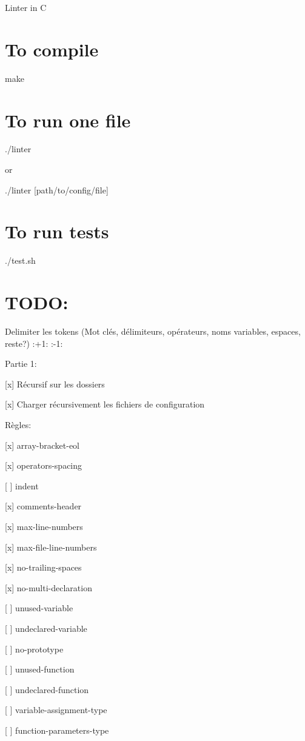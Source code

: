 Linter in C \section*{To compile}

make \section*{To run one file}

./linter

or

./linter \mbox{[}path/to/config/file\mbox{]}

\section*{To run tests}

./test.sh

\section*{T\+O\+DO\+:}


\begin{DoxyItemize}
\item Delimiter les tokens (Mot clés, délimiteurs, opérateurs, noms variables, espaces, reste?) \+:+1\+: \+:-\/1\+:
\item Partie 1\+:
\begin{DoxyItemize}
\item \mbox{[}x\mbox{]} Récursif sur les dossiers
\item \mbox{[}x\mbox{]} Charger récursivement les fichiers de configuration
\end{DoxyItemize}
\item Règles\+:
\begin{DoxyItemize}
\item \mbox{[}x\mbox{]} array-\/bracket-\/eol
\item \mbox{[}x\mbox{]} operators-\/spacing
\item \mbox{[} \mbox{]} indent
\item \mbox{[}x\mbox{]} comments-\/header
\item \mbox{[}x\mbox{]} max-\/line-\/numbers
\item \mbox{[}x\mbox{]} max-\/file-\/line-\/numbers
\item \mbox{[}x\mbox{]} no-\/trailing-\/spaces
\item \mbox{[}x\mbox{]} no-\/multi-\/declaration
\item \mbox{[} \mbox{]} unused-\/variable
\item \mbox{[} \mbox{]} undeclared-\/variable
\item \mbox{[} \mbox{]} no-\/prototype
\item \mbox{[} \mbox{]} unused-\/function
\item \mbox{[} \mbox{]} undeclared-\/function
\item \mbox{[} \mbox{]} variable-\/assignment-\/type
\item \mbox{[} \mbox{]} function-\/parameters-\/type 
\end{DoxyItemize}
\end{DoxyItemize}